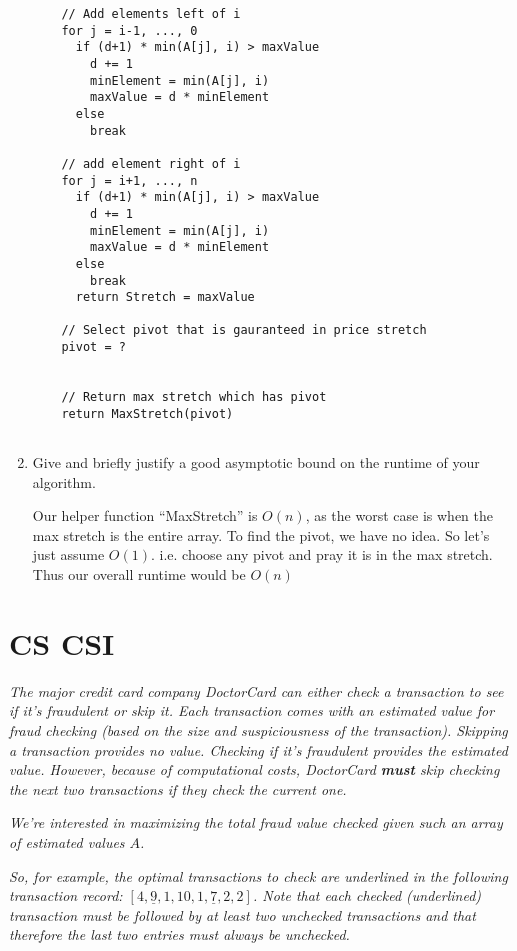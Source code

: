\documentclass[11pt, oneside]{article}   	%
\theoremstyle{definition}
\theoremstyle{remark}
\begin{document}
\begin{enumerate}
\begin{verbatim}
    // Add elements left of i
    for j = i-1, ..., 0
      if (d+1) * min(A[j], i) > maxValue
        d += 1
        minElement = min(A[j], i)
        maxValue = d * minElement
      else
        break
        
    // add element right of i
    for j = i+1, ..., n
      if (d+1) * min(A[j], i) > maxValue
        d += 1
        minElement = min(A[j], i)
        maxValue = d * minElement
      else
        break   
      return Stretch = maxValue  
    
    // Select pivot that is gauranteed in price stretch
    pivot = ?
    
    
    // Return max stretch which has pivot
    return MaxStretch(pivot)
    

\end{verbatim}
\item Give and briefly justify a good asymptotic bound on the runtime of
   your algorithm.
   
   Our helper function ``MaxStretch'' is $O(n)$, as the worst case is when the max stretch is the entire array. To find the pivot, we have no idea. So let's just assume $O(1)$. i.e. choose any pivot and pray it is in the max stretch. Thus our overall runtime would be $O(n)$
\end{enumerate}




\cleardoublepage
\section{CS CSI}
\label{sec-2}

\textit{The major credit card company DoctorCard can either check a transaction to see if it's fraudulent or skip it. Each transaction comes with an estimated value for fraud checking (based on the size and suspiciousness of the transaction). Skipping a transaction provides no value. Checking if it's fraudulent provides the estimated value. However, because of computational costs, DoctorCard \textbf{must} skip checking the next two transactions if they check the current one.}

\textit{We're interested in maximizing the total fraud value checked given such an array of estimated values $A$.}

\textit{So, for example, the optimal transactions to check are underlined in the following transaction record: $[4, \underline{9}, 1, 10, 1, \underline{7}, 2, 2]$. Note that each checked (underlined) transaction must be followed by at least two unchecked transactions and that therefore the last two entries must always be unchecked.}
\end{document}
